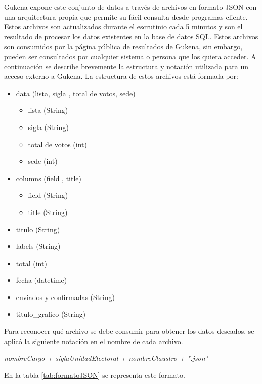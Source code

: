 Gukena expone este conjunto de datos a través de archivos en formato JSON con una arquitectura propia que permite su fácil consulta desde programas cliente. Estos archivos son actualizados durante el escrutinio cada 5 minutos y son el resultado de procesar los datos existentes en la base de datos SQL. Estos archivos son consumidos por la página pública de resultados de Gukena, sin embargo, pueden ser consultados por cualquier sistema o persona que los quiera acceder. A continuación se describe brevemente la estructura y notación utilizada para un acceso externo a Gukena.
La estructura de estos archivos está formada por:
\begin{itemize}
    \item data (lista, sigla , total de votos, sede)
    \begin{itemize}
        \item lista (String)
        \item sigla (String)
        \item total de votos (int)
        \item sede (int)
    \end{itemize}
    \item columns (field , title)
    \begin{itemize}
        \item field (String)
        \item title (String)
    \end{itemize}
    \item titulo (String)
    \item labels (String)
    \item total (int)
    \item fecha (datetime)
    \item enviados y confirmadas (String)
    \item titulo\_grafico (String)
\end{itemize}
Para reconocer qué archivo se debe consumir para obtener los datos deseados,  se aplicó la siguiente notación en el nombre de cada archivo. \newline 

\emph{nombreCargo + siglaUnidadElectoral + nombreClaustro + ".json"} 
\newline

En la tabla \ref{tab:formatoJSON} se representa este formato.

